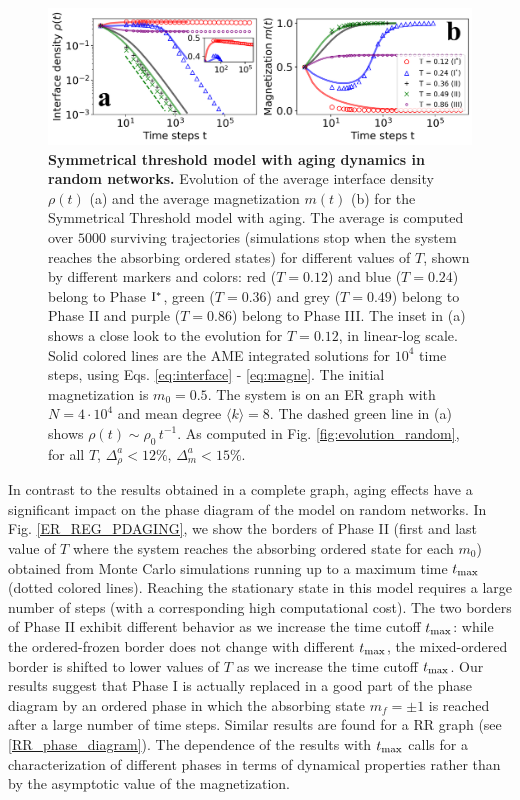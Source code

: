 \begin{figure}[b]
        \centering
        \includegraphics[width=\textwidth]{Figs/Aging_STM/FIG6.pdf}
        \caption{\label{fig:evolution_random_aging} \textbf{Symmetrical threshold model with aging dynamics in random networks.} Evolution of the average interface density $\rho(t)$ (a) and the average magnetization $m(t)$ (b) for the Symmetrical Threshold model with aging. The average is computed over $5000$ surviving trajectories (simulations stop when the system reaches the absorbing ordered states) for different values of $T$, shown by different markers and colors: red ($T = 0.12$) and blue ($T = 0.24$) belong to Phase ${\rm I}^{*}$, green ($T = 0.36$) and grey ($T = 0.49$) belong to Phase II and purple ($T = 0.86$) belong to Phase III. The inset in (a) shows a close look to the evolution for $T = 0.12$, in linear-log scale. Solid colored lines are the AME integrated solutions for $10^4$ time steps, using Eqs. \ref{eq:interface} - \ref{eq:magne}. The initial magnetization is $m_0 = 0.5$. The system is on an ER graph with $N = 4 \cdot 10^4$ and mean degree $\langle k \rangle = 8$. The dashed green line in (a) shows $\rho(t) \sim \rho_0 \, t^{-1}$.
        As computed in Fig. \ref{fig:evolution_random}, for all $T$, $\Delta^{a}_{\rho} < 12\%$, $\Delta^{a}_{m} < 15\%$.}
\end{figure}

In contrast to the results obtained in a complete graph, aging effects have a significant impact on the phase diagram of the model on random networks. In Fig. \ref{ER_REG_PDAGING}, we show the borders of Phase II (first and last value of $T$ where the system reaches the absorbing ordered state for each $m_0$) obtained from Monte Carlo simulations running up to a maximum time $t_{\rm max}$ (dotted colored lines). Reaching the stationary state in this model requires a large number of steps (with a corresponding high computational cost). The two borders of Phase II exhibit different behavior as we increase the time cutoff $t_{\rm max}$: while the ordered-frozen border does not change with different $t_{\rm max}$, the mixed-ordered border is shifted to lower values of $T$ as we increase the time cutoff $t_{\rm max}$. Our results suggest that Phase I is actually replaced in a good part of the phase diagram by an ordered phase in which the absorbing state $m_f = \pm 1$ is reached after a large number of time steps. Similar results are found for a RR graph (see \ref{RR_phase_diagram}). The dependence of the results with $t_{\rm max}$ calls for a characterization of different phases in terms of dynamical properties rather than by the asymptotic value of the magnetization.

